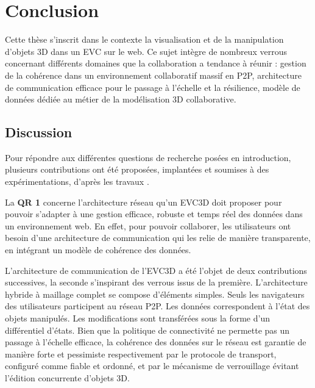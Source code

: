 \chapter{Conclusion}
\label{sec:chap:conclu}
\chaptertable

Cette thèse s'inscrit dans le contexte la visualisation et de la manipulation d'objets 
3D dans un \gls{EVC} sur le web. Ce sujet intègre de nombreux verrous 
concernant différents domaines que la collaboration a tendance à réunir : gestion 
de la cohérence dans un environnement collaboratif massif en \gls{P2P}, 
architecture de communication efficace pour le passage à l'échelle et la résilience, 
modèle de données dédiée au métier de la modélisation 3D collaborative. 

\section{Discussion}
Pour répondre aux différentes questions de recherche posées en introduction, 
plusieurs contributions ont été 
proposées, implantées et soumises à des expérimentations, d'après les travaux 
\cite{Desprat2015a,Desprat2015b,Desprat2016,Desprat2017}. 


La \textbf{QR 1} concerne l'architecture réseau qu'un \gls{EVC3D} doit proposer 
pour 
pouvoir s'adapter à une gestion efficace, robuste et temps réel des données dans 
un environnement web. En effet, pour pouvoir collaborer, les utilisateurs ont besoin 
d'une architecture de communication qui les relie de manière transparente, en 
intégrant un modèle de cohérence des données. 

L'architecture de communication de l'\gls{EVC3D} a été l'objet de deux 
contributions successives, la seconde s'inspirant des verrous issus de la 
première. 
L'architecture hybride à maillage complet se compose d'éléments simples. 
Seuls les navigateurs des utilisateurs participent au réseau \gls{P2P}. Les 
données correspondent à l'état des objets manipulés. 
Les modifications sont transférées 
sous la forme d'un différentiel d'états. Bien que la politique de connectivité ne 
permette pas un passage à l'échelle efficace, la cohérence des données sur le 
réseau est garantie de manière forte et pessimiste respectivement par le protocole 
de transport, configuré comme fiable et ordonné, et par le mécanisme de 
verrouillage évitant l'édition concurrente d'objets 3D.

